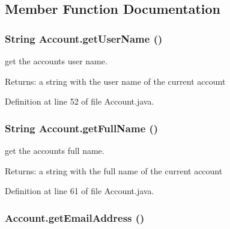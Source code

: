 \subsection{Member Function Documentation}
\hypertarget{classAccount_16fba083bc4400303f070e775272fd11}{
\subsubsection{\setlength{\rightskip}{0pt plus 5cm}String Account.getUserName ()}}
\label{classAccount_16fba083bc4400303f070e775272fd11}


get the accounts user name. 

\begin{Desc}
\item[Returns:]a string with the user name of the current account \end{Desc}


Definition at line 52 of file Account.java.\hypertarget{classAccount_682c54ac7722ac83f9755ef83dfd69aa}{
\subsubsection{\setlength{\rightskip}{0pt plus 5cm}String Account.getFullName ()}}
\label{classAccount_682c54ac7722ac83f9755ef83dfd69aa}


get the accounts full name. 

\begin{Desc}
\item[Returns:]a string with the full name of the current account \end{Desc}


Definition at line 61 of file Account.java.\hypertarget{classAccount_f8a1bb86591b5835fef9287aa4aca550}{
\subsubsection{ Account.getEmailAddress ()}}
\label{classAccount_f8a1bb86591b5835fef9287aa4aca550}


